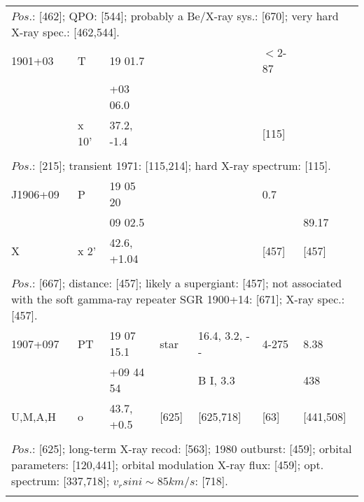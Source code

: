 \documentclass{aa}
\begin{document}
\begin{table*}[h]
\begin{tabular}{p{2.5cm}p{1cm}p{1.8cm}p{2.3cm}p{3.3cm}p{2.0cm}p{2.2cm}}
\\
\multicolumn{7}{p{17.5cm}}{
$Pos$.: [462];  QPO: [544]; probably a Be/X-ray sys.: [670]; very hard X-ray spec.: [462,544].    }\\

\noalign{\smallskip}
\hline
\noalign{\smallskip}
 1901+03      &  T              & 19 01.7        &                    &                      & $<$2-87     &          \\
                       &                  & +03 06.0      &                    &                      &                     &          \\
                       & x 10'         & 37.2, -1.4    &                     &                      & [115]           &           \\
\\
\multicolumn{7}{p{17.5cm}}{
$Pos$.: [215]; transient 1971: [115,214]; hard X-ray spectrum: [115].}\\

\noalign{\smallskip}
\hline
\noalign{\smallskip}
J1906+09    &  P        &       19 05 20   &              &       &   0.7                 &             \\                        
                      &             &       09 02.5     &              &        &                         &   89.17 \\ 
X                   &   x 2'    & 42.6, +1.04     &               &       &   [457]             &   [457] \\
\\
\multicolumn{7}{p{17.5cm}}{
$Pos$.: [667]; distance: [457]; likely a supergiant: [457]; not associated with the soft gamma-ray repeater 
SGR 1900+14: [671]; X-ray spec.: [457].   }\\

\noalign{\smallskip}
\hline
\noalign{\smallskip}
1907+097     & PT       & 19 07 15.1      & star               & 16.4, 3.2, - -         & 4-275         & 8.38                         \\
                       &             & +09 44  54       &                        &  B I, 3.3                &                    & 438               \\
U,M,A,H       & o          & 43.7, +0.5        & [625]            &  [625,718]       & [63]            & [441,508]               \\
\\
\multicolumn{7}{p{17.5cm}}{
$Pos$.: [625]; long-term X-ray recod: [563]; 1980 outburst: [459]; orbital parameters: [120,441]; 
orbital modulation X-ray flux: [459]; opt. spectrum: [337,718]; $v_rsin i \sim 85 km/s$: [718].}\\

\noalign{\smallskip}
\hline
\end{tabular}
\end{table*}
\end{document}

